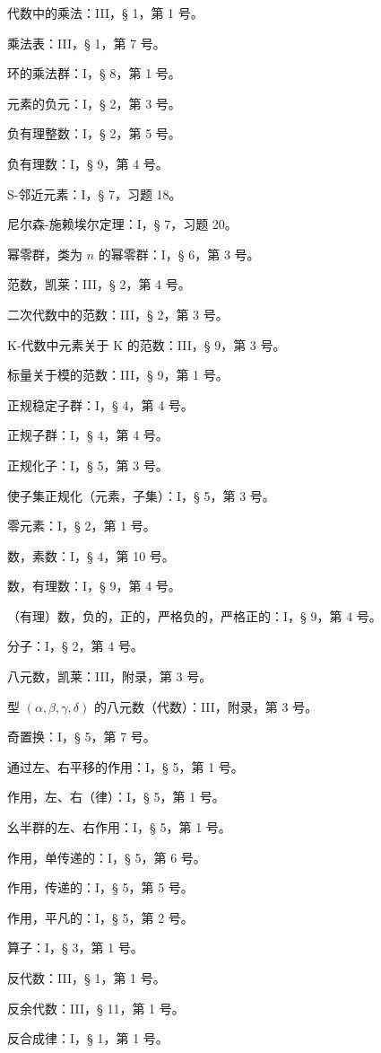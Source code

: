 代数中的乘法：III，§ 1，第 1 号。

乘法表：III，§ 1，第 7 号。

环的乘法群：I，§ 8，第 1 号。

元素的负元：I，§ 2，第 3 号。

负有理整数：I，§ 2，第 5 号。

负有理数：I，§ 9，第 4 号。

S-邻近元素：I，§ 7，习题 18。

尼尔森-施赖埃尔定理：I，§ 7，习题 20。

幂零群，类为 \(n\) 的幂零群：I，§ 6，第 3 号。

范数，凯莱：III，§ 2，第 4 号。

二次代数中的范数：III，§ 2，第 3 号。

K-代数中元素关于 K 的范数：III，§ 9，第 3 号。

标量关于模的范数：III，§ 9，第 1 号。

正规稳定子群：I，§ 4，第 4 号。

正规子群：I，§ 4，第 4 号。

正规化子：I，§ 5，第 3 号。

使子集正规化（元素，子集）：I，§ 5，第 3 号。

零元素：I，§ 2，第 1 号。

数，素数：I，§ 4，第 10 号。

数，有理数：I，§ 9，第 4 号。

（有理）数，负的，正的，严格负的，严格正的：I，§ 9，第 4 号。

分子：I，§ 2，第 4 号。

八元数，凯莱：III，附录，第 3 号。

型 \((\alpha, \beta, \gamma, \delta)\) 的八元数（代数）：III，附录，第 3 号。

奇置换：I，§ 5，第 7 号。

通过左、右平移的作用：I，§ 5，第 1 号。

作用，左、右（律）：I，§ 5，第 1 号。

幺半群的左、右作用：I，§ 5，第 1 号。

作用，单传递的：I，§ 5，第 6 号。

作用，传递的：I，§ 5，第 5 号。

作用，平凡的：I，§ 5，第 2 号。

算子：I，§ 3，第 1 号。

反代数：III，§ 1，第 1 号。

反余代数：III，§ 11，第 1 号。

反合成律：I，§ 1，第 1 号。

